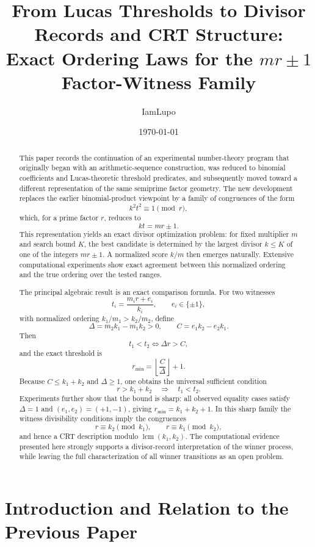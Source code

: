 \documentclass[11pt,a4paper]{article}
\title{\textbf{From Lucas Thresholds to Divisor Records and CRT Structure:}\\
Exact Ordering Laws for the $mr\pm1$ Factor-Witness Family}
\author{IamLupo}
\date{\today}
\begin{document}
\maketitle

\begin{abstract}
This paper records the continuation of an experimental number-theory program that originally began with an arithmetic-sequence construction, was reduced to binomial coefficients and Lucas-theoretic threshold predicates, and subsequently moved toward a different representation of the same semiprime factor geometry. The new development replaces the earlier binomial-product viewpoint by a family of congruences of the form
\[
    k^2t^2\equiv 1 \pmod r,
\]
which, for a prime factor $r$, reduces to
\[
    kt=mr\pm1.
\]
This representation yields an exact divisor optimization problem: for fixed multiplier $m$ and search bound $K$, the best candidate is determined by the largest divisor $k\le K$ of one of the integers $mr\pm1$. A normalized score $k/m$ then emerges naturally. Extensive computational experiments show exact agreement between this normalized ordering and the true ordering over the tested ranges.

The principal algebraic result is an exact comparison formula. For two witnesses
\[
    t_i=\frac{m_i r+e_i}{k_i},\qquad e_i\in\{\pm1\},
\]
with normalized ordering $k_1/m_1>k_2/m_2$, define
\[
    \Delta=m_2k_1-m_1k_2>0,
    \qquad
    C=e_1k_2-e_2k_1.
\]
Then
\[
    t_1<t_2 \iff \Delta r>C,
\]
and the exact threshold is
\[
    r_{\min}=\left\lfloor\frac{C}{\Delta}\right\rfloor+1.
\]
Because $C\le k_1+k_2$ and $\Delta\ge1$, one obtains the universal sufficient condition
\[
    r>k_1+k_2\quad\Longrightarrow\quad t_1<t_2.
\]
Experiments further show that the bound is sharp: all observed equality cases satisfy $\Delta=1$ and $(e_1,e_2)=(+1,-1)$, giving $r_{\min}=k_1+k_2+1$. In this sharp family the witness divisibility conditions imply the congruences
\[
    r\equiv k_2\pmod{k_1},\qquad
    r\equiv k_1\pmod{k_2},
\]
and hence a CRT description modulo $\operatorname{lcm}(k_1,k_2)$. The computational evidence presented here strongly supports a divisor-record interpretation of the winner process, while leaving the full characterization of all winner transitions as an open problem.
\end{abstract}

\tableofcontents
\newpage

\section{Introduction and Relation to the Previous Paper}
\end{document}
